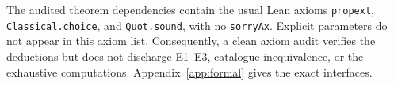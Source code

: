 The audited theorem dependencies contain the usual Lean axioms \texttt{propext}, \texttt{Classical.choice}, and \texttt{Quot.sound}, with no \texttt{sorryAx}. Explicit parameters do not appear in this axiom list. Consequently, a clean axiom audit verifies the deductions but does not discharge E1--E3, catalogue inequivalence, or the exhaustive computations. Appendix~\ref{app:formal} gives the exact interfaces.

